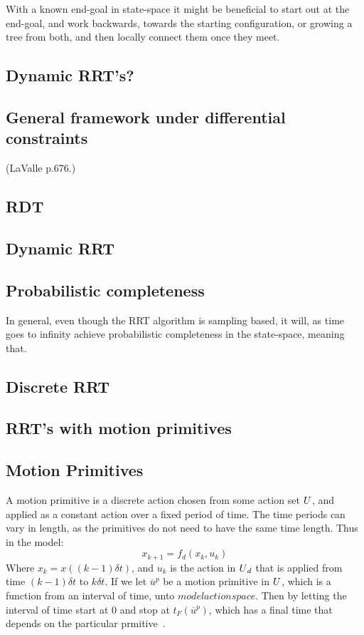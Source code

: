 With a known end-goal in state-space it might be beneficial to start out at the
end-goal, and work backwards, towards the starting configuration, or growing a
tree from both, and then locally connect them once they meet.

\subsection{Dynamic RRT's?}

\begin{figure}
  
\end{figure}

\subsection{General framework under differential constraints} (LaValle p.676.)


\subsection{RDT}


\subsection{Dynamic RRT}

\subsection{Probabilistic completeness}

In general, even though the \ac{RRT} algorithm is sampling based, it will, as
time goes to infinity achieve probabilistic completeness in the state-space,
meaning that.

\subsection{Discrete RRT}

\subsection{RRT's with motion primitives}


\subsection{Motion Primitives}

A motion primitive is a discrete action chosen from some action set
\(U{}\), and applied as a constant action over a fixed period of
time. The time periods can vary in length, as the primitives do not need to have
the same time length. Thus in the model:
\[
  x_{k+1} = f_d(x_k,u_k)
\]
Where \(x_k = x((k-1)\delta{}t)\), and \(u_k\) is the action in
\(U{}_d\) that is applied from time \((k-1)\delta{}t\) to
\(k\delta{}t\). If we let \(\overline{u}^p\) be a motion primitive in
\(U{}\), which is a function from an interval of time, unto
\(modelactionspace{}\). Then by letting the interval of time start at 0 and stop
at \(t_F(\overline{u}^p)\), which has a final time that depends on the
particular prmitive~\cite{Lav06}.

